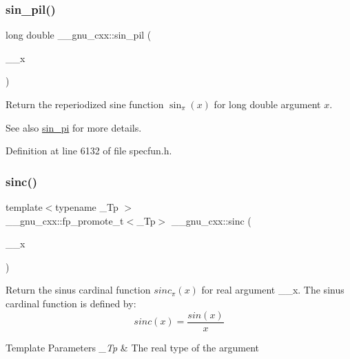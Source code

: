 \subsubsection{\texorpdfstring{sin\+\_\+pil()}{sin\_pil()}}
{\footnotesize\ttfamily long double \+\_\+\+\_\+gnu\+\_\+cxx\+::sin\+\_\+pil (\begin{DoxyParamCaption}\item[{long double}]{\+\_\+\+\_\+x }\end{DoxyParamCaption})\hspace{0.3cm}{\ttfamily [inline]}}

Return the reperiodized sine function $ \sin_\pi(x) $ for {\ttfamily long double} argument $ x $.

\begin{DoxySeeAlso}{See also}
\hyperlink{group__gnu__math__spec__func_ga220f8a9a0477697cff96e84dc911d5f0}{sin\+\_\+pi} for more details. 
\end{DoxySeeAlso}


Definition at line 6132 of file specfun.\+h.

\mbox{\label{group__gnu__math__spec__func_ga09976b5d041113979c93613cc3700348}} 
\subsubsection{\texorpdfstring{sinc()}{sinc()}}
{\footnotesize\ttfamily template$<$typename \+\_\+\+Tp $>$ \\
\+\_\+\+\_\+gnu\+\_\+cxx\+::fp\+\_\+promote\+\_\+t$<$\+\_\+\+Tp$>$ \+\_\+\+\_\+gnu\+\_\+cxx\+::sinc (\begin{DoxyParamCaption}\item[{\+\_\+\+Tp}]{\+\_\+\+\_\+x }\end{DoxyParamCaption})\hspace{0.3cm}{\ttfamily [inline]}}

Return the sinus cardinal function $ sinc_\pi(x) $ for real argument {\ttfamily \+\_\+\+\_\+x}. The sinus cardinal function is defined by\+: \[ sinc(x) = \frac{sin(x)}{x} \]


\begin{DoxyTemplParams}{Template Parameters}
{\em \+\_\+\+Tp} & The real type of the argument \\
\hline
\end{DoxyTemplParams}

